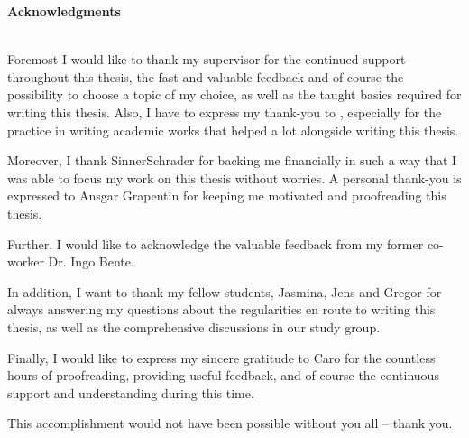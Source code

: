 \thispagestyle{empty}\thispagestyle{noheader}
\begin{large}
	\textbf{Acknowledgments} \\ \\
\end{large}

Foremost I would like to thank my supervisor \firstTutor for the continued support throughout this thesis, the fast and valuable feedback and of course the possibility to choose a topic of my choice, as well as the taught basics required for writing this thesis. Also, I have to express my thank-you to \secondTutor, especially for the practice in writing academic works that helped a lot alongside writing this thesis.

Moreover, I thank SinnerSchrader for backing me financially in such a way that I was able to focus my work on this thesis without worries. A personal thank-you is expressed to Ansgar Grapentin for keeping me motivated and proofreading this thesis.

Further, I would like to acknowledge the valuable feedback from my former co-worker Dr. Ingo Bente.

In addition, I want to thank my fellow students, Jasmina, Jens and Gregor for always answering my questions about the regularities en route to writing this thesis, as well as the comprehensive discussions in our study group.

Finally, I would like to express my sincere gratitude to Caro for the countless hours of proofreading, providing useful feedback, and of course the continuous support and understanding during this time.

This accomplishment would not have been possible without you all -- thank you.

\newpage